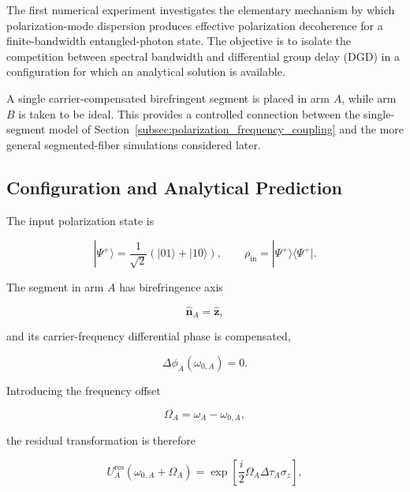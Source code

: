 
The first numerical experiment investigates the elementary mechanism by which
polarization-mode dispersion produces effective polarization decoherence for a
finite-bandwidth entangled-photon state. The objective is to isolate the
competition between spectral bandwidth and differential group delay (DGD) in a
configuration for which an analytical solution is available.

A single carrier-compensated birefringent segment is placed in arm \(A\), while
arm \(B\) is taken to be ideal. This provides a controlled connection between the
single-segment model of
Section~\ref{subsec:polarization_frequency_coupling} and the more general
segmented-fiber simulations considered later.


\subsection{Configuration and Analytical Prediction}
\label{subsec:experiment_1_configuration_analytics}

The input polarization state is

\begin{equation}
|\Psi^+\rangle
=
\frac{1}{\sqrt{2}}
\left(
|01\rangle+|10\rangle
\right),
\qquad
\rho_{\mathrm{in}}
=
|\Psi^+\rangle\langle\Psi^+|.
\label{eq:experiment_1_input_state}
\end{equation}

The segment in arm \(A\) has birefringence axis

\[
\hat{\mathbf n}_A=\hat{\mathbf z},
\]

and its carrier-frequency differential phase is compensated,

\[
\Delta\phi_A(\omega_{0,A})=0.
\]

Introducing the frequency offset

\[
\Omega_A=\omega_A-\omega_{0,A},
\]

the residual transformation is therefore

\begin{equation}
U_A^{\mathrm{res}}
\left(
\omega_{0,A}+\Omega_A
\right)
=
\exp
\left[
\frac{i}{2}
\Omega_A
\Delta\tau_A
\sigma_z
\right],
\label{eq:experiment_1_single_segment_operator}
\end{equation}

